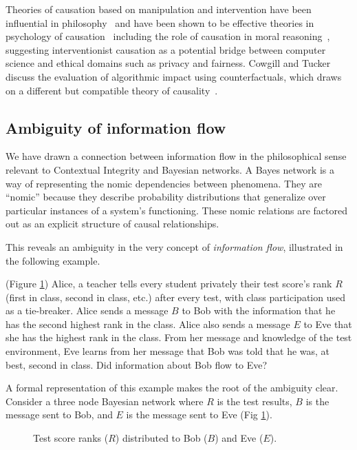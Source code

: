 \documentclass[../thesis.tex]{subfiles}
\begin{document}
Theories of causation based on manipulation and intervention
have been influential in philosophy~\cite{woodward2005making}
and have been shown to be effective theories in
psychology of causation~\cite{sloman2005causal}
including the role of causation in moral 
reasoning~\cite{sloman2009causal}, suggesting interventionist
causation as a potential bridge between computer science
and ethical domains such as privacy and fairness.
Cowgill and Tucker~\cite{cowgillalgorithmic} 
discuss the evaluation
of algorithmic impact using counterfactuals, which
draws on a different but compatible theory of
causality~\cite{rubin1974estimating}.

\subsection{Ambiguity of information flow}
\label{sec:ambiguity}

We have drawn a connection
between information flow in the philosophical sense
relevant to Contextual Integrity and Bayesian networks.
A Bayes network is a way of representing the nomic dependencies
between phenomena.
They are ``nomic'' because they describe probability 
distributions that generalize over particular instances of a 
system's functioning. These nomic relations
are factored out as an explicit structure of causal relationships.

This reveals an ambiguity in the very concept of
\emph{information flow},
illustrated in the following example.

\begin{exm}
  (Figure \ref{fig:school})
Alice, a teacher tells every student
privately their test score's rank $R$ (first in class,
second in class, etc.) after every test, with class
participation used as a tie-breaker.
Alice sends a message $B$ to Bob with the information that
he has the second highest rank in the class.
Alice also sends a message $E$ to Eve that she has
the highest rank in the class.
From her message and knowledge of the test environment,
Eve learns from her message that Bob was told that he
was, at best, second in class.
Did information about Bob flow to Eve?
\end{exm}

A formal representation of this example makes the
root of the ambiguity clear.
Consider a three node Bayesian network where $R$ is the test
results, $B$ is the message sent to Bob, and $E$ is
the message sent to Eve (Fig \ref{fig:school}).

\begin{figure}
  \label{fig:school}
\begin{center}
\end{center}
\caption{Test score ranks ($R$) distributed to Bob ($B$) and Eve ($E$).}
\end{figure}
\end{document}
